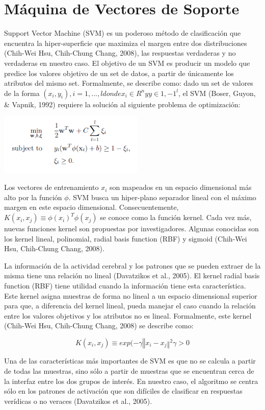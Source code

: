 \section{Máquina de Vectores de Soporte}
Support Vector Machine (SVM) es un poderoso método de clasificación que encuentra la hiper-superficie que maximiza el margen entre dos distribuciones (Chih-Wei Hsu, Chih-Chung Chang, 2008), las respuestas verdaderas y no verdaderas en nuestro caso. El objetivo de un SVM es producir un modelo que predice los valores objetivo de un set de datos, a partir de únicamente los atributos del mismo set.  Formalmente, se describe como: dado un set de valores de la forma $(x_i,y_i), i=1, ..., l  donde  x_i \in R^n y y\in{1,-1}^l$, el SVM (Boser, Guyon, \& Vapnik, 1992) requiere la solución al siguiente problema de optimización: 
\begin{center}
\includegraphics[height=1.15in]{figuras/Imagen1.png}
\end{center}
Los vectores de entrenamiento $x_i$ son mapeados en un espacio dimensional más alto por la función $\phi$. SVM busca un hiper-plano separador lineal con el máximo margen en este espacio dimensional. Consecuentemente, $K(x_i,x_j)\equiv \phi(x_i )^T \phi(x_j)$ se conoce como la función kernel. Cada vez más, nuevas funciones kernel son propuestas por investigadores. Algunas conocidas son los kernel lineal, polinomial, radial basis function (RBF) y sigmoid (Chih-Wei Hsu, Chih-Chung Chang, 2008). 

La información de la actividad cerebral y los patrones que se pueden extraer de la misma tiene una relación no lineal (Davatzikos et al., 2005). El kernel radial basis function (RBF) tiene utilidad cuando la información tiene esta característica. Este kernel asigna muestras de forma no lineal a un espacio dimensional superior para que, a diferencia del kernel lineal, pueda manejar el caso cuando la relación entre los valores objetivos y los atributos no es lineal. Formalmente, este kernel (Chih-Wei Hsu, Chih-Chung Chang, 2008) se describe como:

$$K(x_i,x_j )\equiv exp(-\gamma‖x_i-x_j ‖^2\gamma>0$$

Una de las características más importantes de SVM es que no se calcula a partir de todas las muestras, sino sólo a partir de muestras que se encuentran cerca de la interfaz entre los dos grupos de interés. En nuestro caso, el algoritmo se centra sólo en los patrones de activación que son difíciles de clasificar en respuestas verídicas o no veraces (Davatzikos et al., 2005).

